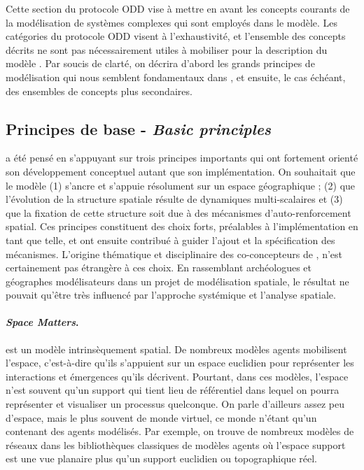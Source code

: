 Cette section du protocole ODD vise à mettre en avant les concepts courants de la modélisation de systèmes complexes qui sont employés dans le modèle.
Les catégories du protocole ODD
visent à l'exhaustivité, et l'ensemble des concepts décrits ne sont pas nécessairement utiles à mobiliser pour la description du modèle \simfeodal{}.
Par soucis de clarté, on décrira d'abord les grands principes de modélisation qui nous semblent fondamentaux dans \simfeodal{}, et ensuite, le cas échéant, des ensembles de concepts plus secondaires.

\subsection{Principes de base - \textit{Basic principles} \label{subsec:basic-principles}}

\simfeodal{} a été pensé en s'appuyant sur trois principes importants qui ont fortement orienté son développement conceptuel autant que son implémentation. On souhaitait que le modèle (1) s'ancre et s'appuie résolument sur un espace géographique ; (2) que l'évolution de la structure spatiale résulte de dynamiques multi-scalaires et (3) que la fixation de cette structure soit due à des mécanismes d'auto-renforcement spatial.
Ces principes constituent des choix forts, préalables à l'implémentation en tant que telle, et ont ensuite contribué à guider l'ajout et la spécification des mécanismes.
L'origine thématique et disciplinaire des co-concepteurs de \simfeodal{}, n'est certainement pas étrangère à ces choix.
En rassemblant archéologues et géographes modélisateurs dans un projet de modélisation spatiale, le résultat ne pouvait qu'être très influencé par l'approche systémique et l'analyse spatiale.


\paragraph{\og{}\textit{Space Matters}\fg{}.}

\simfeodal{} est un modèle intrinsèquement spatial.
De nombreux modèles agents \og mobilisent\fg{} l'espace, c'est-à-dire qu'ils s'appuient sur un espace euclidien pour représenter les interactions et émergences qu'ils décrivent.
Pourtant, dans ces modèles, l'espace n'est souvent qu'un support qui tient lieu de référentiel dans lequel on pourra représenter et visualiser un processus quelconque.
On parle d'ailleurs assez peu d'espace, mais le plus souvent de \og monde virtuel\fg{}, ce monde n'étant qu'un contenant des agents modélisés.
Par exemple, on trouve de nombreux modèles de réseaux dans les bibliothèques classiques de modèles agents où l'espace support est une vue planaire plus qu'un support euclidien ou topographique réel.


